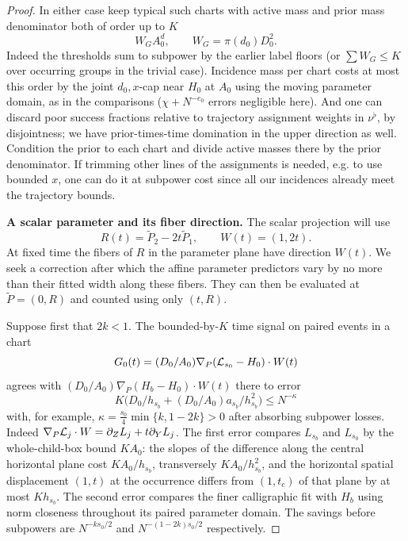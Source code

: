 \begin{proof}
In either case keep typical such charts with active mass and prior mass denominator both of order up to \(K\)
\[
 W_G A_0^d,\qquad W_G=\pi(d_0)D_0^2 .
\]
Indeed the thresholds sum to subpower by the earlier label floors (or \(\sum W_G\le K\) over occurring groups in the trivial case). Incidence mass per chart costs at most this order by the joint \(d_0,x\)-cap near \(H_0\) at \(A_0\) using the moving parameter domain, as in the comparisons (\(\chi+N^{-e_0}\) errors negligible here). And one can discard poor success fractions relative to trajectory assignment weights in \(\nu^\flat\), by disjointness; we have prior-times-time domination in the upper direction as well. Condition the prior to each chart and divide active masses there by the prior denominator. If trimming other lines of the assignments is needed, e.g. to use bounded \(x\), one can do it at subpower cost since all our incidences already meet the trajectory bounds.

\par\smallskip\noindent\textbf{A scalar parameter and its fiber direction.}\quad
The scalar projection will use
\[
 R(t)=\widetilde P_2-2t\widetilde P_1,
 \qquad W(t)=(1,2t).
\]
At fixed time the fibers of \(R\) in the parameter plane have
direction \(W(t)\). We seek a correction after which the affine
parameter predictors vary by no more than their fitted width along
these fibers. They can then be evaluated at \(\widetilde P=(0,R)\)
and counted using only \((t,R)\).

Suppose first that \(2k<1\). The bounded-by-\(K\) time signal
on paired events in a chart
\[
 G_0(t)=(D_0/A_0)\nabla_P({\cal L}_{s_0}-H_0)\cdot W(t)
\]
agrees with \((D_0/A_0)\nabla_P(H_b-H_0)\cdot W(t)\) there to error
\[
 K\big(D_0/h_{s_b}+(D_0/A_0)a_{s_b}/h_{s_b}^2\big)\le N^{-\kappa}
\]
with, for example, \(\kappa=\tfrac{s_0}{4}\min\{k,1-2k\}>0\) after absorbing subpower losses. Indeed \(\nabla_P{\cal L}_j\cdot W=\partial_Z L_j+t\partial_Y L_j\). The first error compares \(L_{s_b}\) and \(L_{s_0}\) by the whole-child-box bound \(K A_0\): the slopes of the difference along the central horizontal plane cost \(K A_0/h_{s_b}\), transversely \(K A_0/h_{s_b}^2\), and the horizontal spatial displacement \((1,t)\) at the occurrence differs from \((1,t_c)\) of that plane by at most \(K h_{s_b}\). The second error compares the finer calligraphic fit with \(H_b\) using norm closeness throughout its paired parameter domain. The savings before subpowers are \(N^{-ks_0/2}\) and \(N^{-(1-2k)s_0/2}\) respectively.


\end{proof}
